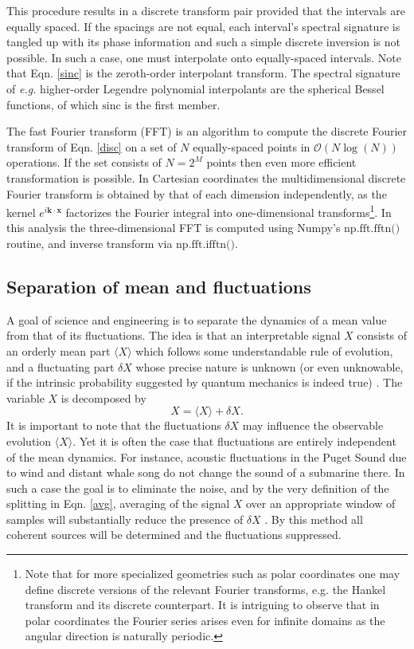 \documentclass{article}
\begin{document}
This procedure results in a discrete transform pair provided that the intervals are equally spaced. If the spacings are not equal, each interval's spectral signature is tangled up with its phase information and such a simple discrete inversion is not possible. In such a case, one must interpolate onto equally-spaced intervals. Note that Eqn. \ref{sinc} is the zeroth-order interpolant transform. The spectral signature of \textit{e.g.} higher-order Legendre polynomial interpolants are the spherical Bessel functions, of which $\text{sinc}$ is the first member.

The fast Fourier transform (FFT) is an algorithm to compute the discrete Fourier transform of Eqn. \ref{disc} on a set of $N$ equally-spaced points in $\mathcal{O}(N\log(N))$ operations. If the set consists of $N = 2^M$ points then even more efficient transformation is possible. In Cartesian coordinates the multidimensional discrete Fourier transform is obtained by that of each dimension independently, as the kernel $e^{i\bm{k}\cdot\bm{x}}$ factorizes the Fourier integral into one-dimensional transforms\footnote{Note that for more specialized geometries such as polar coordinates one may define discrete versions of the relevant Fourier transforms, e.g. the Hankel transform and its discrete counterpart. It is intriguing to observe that in polar coordinates the Fourier series arises even for infinite domains as the angular direction is naturally periodic.}. In this analysis the three-dimensional FFT is computed using Numpy's $\text{np.fft.fftn()}$ routine, and inverse transform via $\text{np.fft.ifftn()}$.

\subsection{Separation of mean and fluctuations}\label{mean_sect}
A goal of science and engineering is to separate the dynamics of a mean value from that of its fluctuations. The idea is that an interpretable signal $X$ consists of an orderly mean part $\langle X\rangle$ which follows some understandable rule of evolution, and a fluctuating part $\delta X$ whose precise nature is unknown (or even unknowable, if the intrinsic probability suggested by quantum mechanics is indeed true) \cite{vankampen}. The variable $X$ is decomposed by
\begin{equation}
  X = \langle X\rangle + \delta X.\label{avg}
\end{equation}
It is important to note that the fluctuations $\delta X$ may influence the observable evolution $\langle X\rangle$. Yet it is often the case that fluctuations are entirely independent of the mean dynamics. For instance, acoustic fluctuations in the Puget Sound due to wind and distant whale song do not change the sound of a submarine there. In such a case the goal is to eliminate the noise, and by the very definition of the splitting in Eqn. \ref{avg}, averaging of the signal $X$ over an appropriate window of samples will substantially reduce the presence of $\delta X$ \cite{kutz}. By this method all coherent sources will be determined and the fluctuations suppressed.
\end{document}

